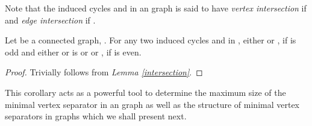 \documentclass[runningheads]{llncs}
\begin{document}
                                                                                                                                                                               \noindent Note that the induced cycles  and  in an  graph  is said to have \emph{vertex intersection} if  and \emph{edge intersection} if .
                                                                                                                                                                                                                                                                                                                                                               \begin{corollary}                                                                                                                                                                                                                                                                                                                                                                                                                                                                                                                                       \label{intersectionseparate} Let  be a connected  graph, . For any two induced cycles  and  in ,  either  or , if  is odd and either  or  is  or  or , if  is even.                                                                                                                                                                                   \end{corollary}                                                                                                                                                                                                                                                                                                                                                            \begin{proof}                                                                                                                                                                              Trivially follows from \emph{Lemma \ref{intersection}}.                                                                                                                                                                                   \end{proof}

This corollary acts as a powerful tool to determine the maximum size of the minimal vertex separator in an  graph as well as the structure of minimal vertex separators in  graphs which we shall present next.                                                                                                                                                                                 
                                                                                                                                                                                 
\end{document}
